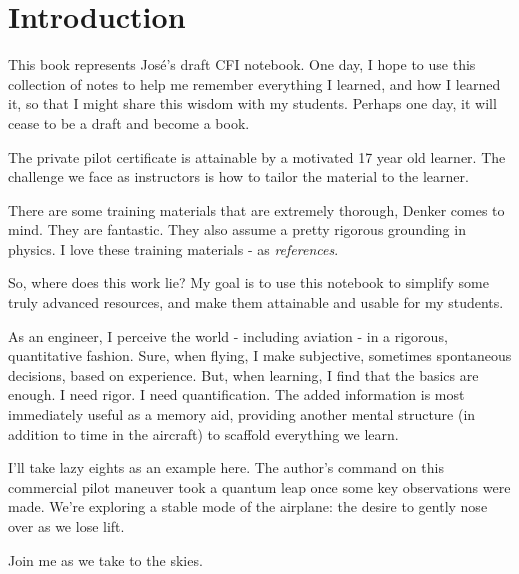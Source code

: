 \section*{Introduction}

This book represents Jos\'e's draft CFI notebook. One day, I hope to use this collection of notes to help me remember everything I learned, and how I learned it, so that I might share this wisdom with my students. Perhaps one day, it will cease to be a draft and become a book.

The private pilot certificate is attainable by a motivated 17 year old learner. The challenge we face as instructors is
how to tailor the material to the learner.

There are some training materials that are extremely thorough, Denker \cite{denker} comes to mind. They are fantastic. They also assume a pretty rigorous grounding in physics. I love these training materials - as \emph{references}.

So, where does this work lie? My goal is to use this notebook to simplify some truly advanced resources, and make them attainable
and usable for my students.

As an engineer, I perceive the world - including aviation - in a rigorous, quantitative fashion. Sure, when flying, I make subjective, sometimes spontaneous decisions, based on experience. But, when learning, I find that the basics are enough. I need rigor. I need quantification. The added information is most immediately useful as a memory aid, providing another mental structure (in addition to time in the aircraft) to scaffold everything we learn.

I'll take lazy eights as an example here. The author's command on this commercial pilot maneuver took a quantum leap once some key observations were made. We're exploring a stable mode of the airplane: the desire to gently nose over as we lose lift.

Join me as we take to the skies.

